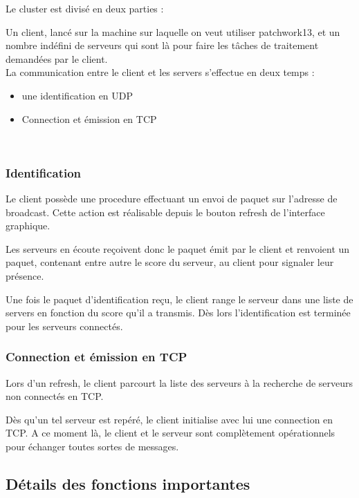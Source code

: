 \documentclass[14pt,a4paper]{report}
\begin{document}
Le cluster est divis\'e en deux parties :

Un client, lanc\'e sur la machine sur laquelle on veut utiliser patchwork13, et
 un nombre ind\'efini de serveurs qui sont l\`a pour faire les t\^aches de 
traitement demand\'ees par le client. \\

La communication entre le client et les servers s'effectue en deux temps :

\begin{itemize}
\item une identification en UDP
\item Connection et \'emission en TCP
\end{itemize}
\rule{0cm}{0cm} \\

\subsubsection{Identification}

Le client poss\`ede une procedure effectuant un envoi de paquet sur 
l'adresse de broadcast. Cette action est r\'ealisable depuis le bouton
refresh de l'interface graphique.

 Les serveurs en \'ecoute re\c{c}oivent
donc le paquet \'emit par le client et renvoient un paquet, contenant
entre autre le score du serveur, au client pour signaler leur
pr\'esence.

 Une fois le paquet  d'identification re\c{c}u,
le client range le serveur dans une liste
de servers  en fonction du score qu'il a transmis.
D\`es lors l'identification est 
termin\'ee pour les serveurs connect\'es.
\\[1cm]

\subsubsection{Connection et \'emission en TCP}

Lors d'un refresh, le client parcourt la liste des serveurs \`a la recherche de
serveurs non connect\'es en TCP.

D\`es qu'un tel serveur est rep\'er\'e, le 
client initialise avec lui une connection en TCP. A ce moment l\`a, le client 
et le serveur sont compl\`etement op\'erationnels pour \'echanger toutes
sortes de messages. \\


\subsection{D\'etails des fonctions importantes}
\end{document}
